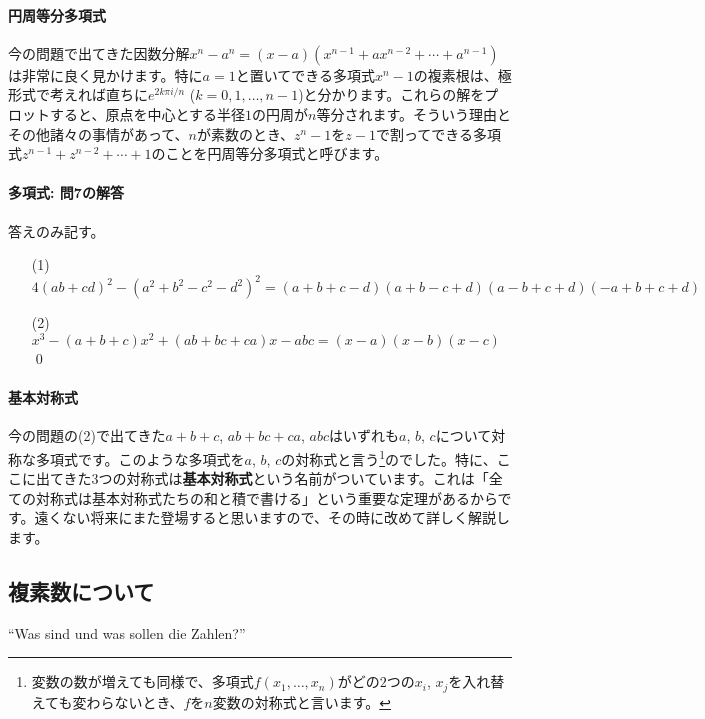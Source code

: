 \paragraph{円周等分多項式} 今の問題で出てきた因数分解$x^n-a^n=(x-a)(x^{n-1}+ax^{n-2}+\cdots+a^{n-1})$は非常に良く見かけます。特に$a=1$と置いてできる多項式$x^n-1$の複素根は、極形式で考えれば直ちに$e^{2k\pi i/n}$ ($k=0,1,\ldots,n-1$)と分かります。これらの解をプロットすると、原点を中心とする半径$1$の円周が$n$等分されます。そういう理由とその他諸々の事情があって、$n$が素数のとき、$z^n-1$を$z-1$で割ってできる多項式$z^{n-1}+z^{n-2}+\cdots+1$のことを円周等分多項式と呼びます。

\paragraph{多項式: 問7の解答} 答えのみ記す。
\begin{itemize}
\item[(1)] %
$4(ab+cd)^2-(a^2+b^2-c^2-d^2)^2
= (a+b+c-d)(a+b-c+d)(a-b+c+d)(-a+b+c+d)$
\item[(2)] $x^3-(a+b+c)x^2+(ab+bc+ca)x-abc = (x-a)(x-b)(x-c)$ \qed
\end{itemize}

\paragraph{基本対称式}

今の問題の(2)で出てきた$a+b+c$, $ab+bc+ca$, $abc$はいずれも$a$, $b$, $c$について対称な多項式です。このような多項式を$a$, $b$, $c$の対称式と言う\footnote{変数の数が増えても同様で、多項式$f(x_1,\ldots,x_n)$がどの$2$つの$x_i$, $x_j$を入れ替えても変わらないとき、$f$を$n$変数の対称式と言います。}のでした。特に、ここに出てきた$3$つの対称式は\textbf{基本対称式}という名前がついています。これは「全ての対称式は基本対称式たちの和と積で書ける」という重要な定理があるからです。遠くない将来にまた登場すると思いますので、その時に改めて詳しく解説します。

\subsection{複素数について}
\begin{citation}
{}``Was sind und was sollen die Zahlen?''
\end{citation}


